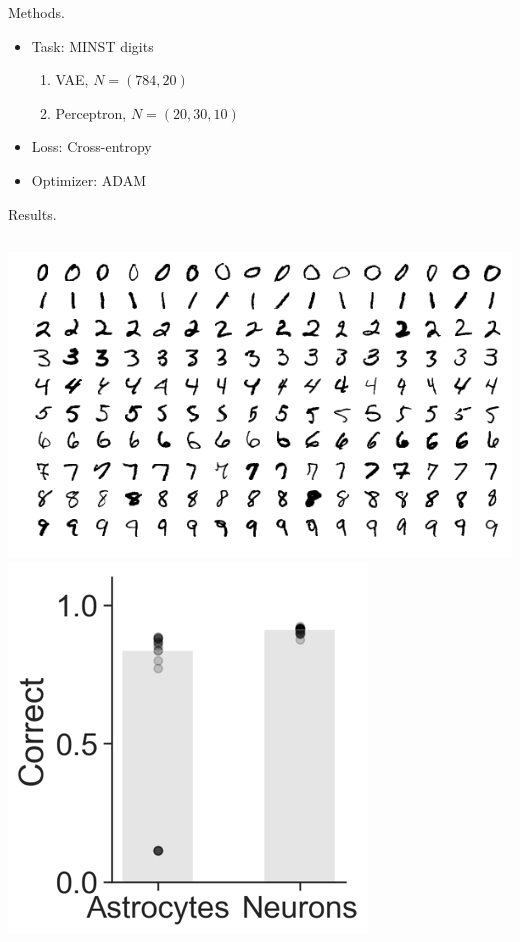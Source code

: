 \documentclass[10pt]{beamer}
\begin{document}
\begin{frame}[fragile]{Methods.}
\begin{itemize}
    \item Task: MINST digits
    \begin{enumerate}
        \item VAE, $N=(784,20)$
        \item Perceptron, $N=(20,30,10)$    
    \end{enumerate}
    \item Loss: Cross-entropy
    \item Optimizer: ADAM
\end{itemize}
\end{frame}

\begin{frame}[fragile]{Results.}
\begin{columns}
    \centering
    \includegraphics[scale=0.2]{images/minst.png} 
    \centering
    \includegraphics[scale=0.3]{images/results.png} 
\end{columns}
\end{frame}
\end{document}
